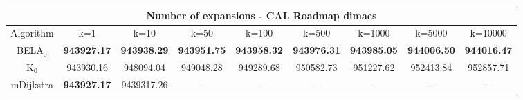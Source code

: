 \begin{tabular}{c|cccccccc}\toprule
\multicolumn{9}{c}{Number of expansions - CAL Roadmap dimacs}\\ \midrule
Algorithm & k=1 & k=10 & k=50 & k=100 & k=500 & k=1000 & k=5000 & k=10000 \\ \midrule
BELA$_0$ & \textbf{943927.17} & \textbf{943938.29} & \textbf{943951.75} & \textbf{943958.32} & \textbf{943976.31} & \textbf{943985.05} & \textbf{944006.50} & \textbf{944016.47} \\
K$_0$ & 943930.16 & 948094.04 & 949048.28 & 949289.68 & 950582.73 & 951227.62 & 952413.84 & 952857.71 \\
mDijkstra & \textbf{943927.17} & 9439317.26 & -- & -- & -- & -- & -- & -- \\ \bottomrule 
\end{tabular}
